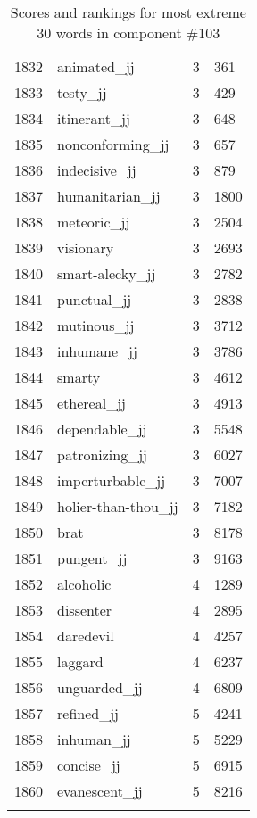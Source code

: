 \begin{longtable}[!htbp]{| rlr@{.}l |}
    1832 & animated\_jj & 3 & 361 \\
    1833 & testy\_jj & 3 & 429 \\
    1834 & itinerant\_jj & 3 & 648 \\
    1835 & nonconforming\_jj & 3 & 657 \\
    1836 & indecisive\_jj & 3 & 879 \\
    1837 & humanitarian\_jj & 3 & 1800 \\
    1838 & meteoric\_jj & 3 & 2504 \\
    1839 & visionary & 3 & 2693 \\
    1840 & smart-alecky\_jj & 3 & 2782 \\
    1841 & punctual\_jj & 3 & 2838 \\
    1842 & mutinous\_jj & 3 & 3712 \\
    1843 & inhumane\_jj & 3 & 3786 \\
    1844 & smarty & 3 & 4612 \\
    1845 & ethereal\_jj & 3 & 4913 \\
    1846 & dependable\_jj & 3 & 5548 \\
    1847 & patronizing\_jj & 3 & 6027 \\
    1848 & imperturbable\_jj & 3 & 7007 \\
    1849 & holier-than-thou\_jj & 3 & 7182 \\
    1850 & brat & 3 & 8178 \\
    1851 & pungent\_jj & 3 & 9163 \\
    1852 & alcoholic & 4 & 1289 \\
    1853 & dissenter & 4 & 2895 \\
    1854 & daredevil & 4 & 4257 \\
    1855 & laggard & 4 & 6237 \\
    1856 & unguarded\_jj & 4 & 6809 \\
    1857 & refined\_jj & 5 & 4241 \\
    1858 & inhuman\_jj & 5 & 5229 \\
    1859 & concise\_jj & 5 & 6915 \\
    1860 & evanescent\_jj & 5 & 8216 \\
    \hline
    \caption{Scores and rankings for most extreme 30 words in component \#103} \\
\end{longtable}
